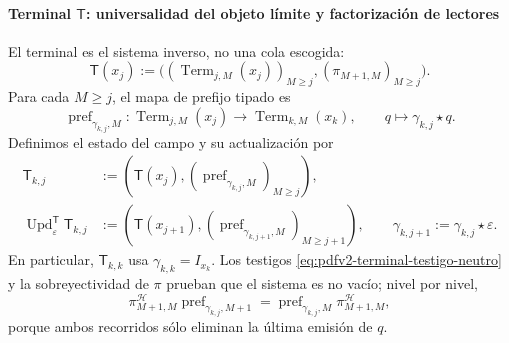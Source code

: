 \paragraph{Terminal \(\mathsf T\): universalidad del objeto límite y factorización de lectores}
El terminal es el sistema inverso, no una cola escogida:
\begin{equation}
\label{eq:pdfv2-terminal-sistema-inverso-campo}
 \mathsf T(x_j):=
 \bigl((\operatorname{Term}_{j,M}(x_j))_{M\geq j},
       (\pi_{M+1,M})_{M\geq j}\bigr).
\end{equation}
Para cada \(M\geq j\), el mapa de prefijo tipado es
\begin{equation}
\label{eq:pdfv2-terminal-update-t}
 \operatorname{pref}_{\gamma_{k,j},M}:
 \operatorname{Term}_{j,M}(x_j)\longrightarrow
 \operatorname{Term}_{k,M}(x_k),\qquad
 q\longmapsto\gamma_{k,j}\star q.
\end{equation}
Definimos el estado del campo y su actualización por
\begin{align}
 \mathsf T_{k,j}
 &:=
 \left(\mathsf T(x_j),
   (\operatorname{pref}_{\gamma_{k,j},M})_{M\geq j}\right),
 \label{eq:pdfv2-terminal-estado-t}\\
 \operatorname{Upd}^{\mathsf T}_{\varepsilon}\mathsf T_{k,j}
 &:=
 \left(\mathsf T(x_{j+1}),
   (\operatorname{pref}_{\gamma_{k,j+1},M})_{M\geq j+1}\right),
 \qquad \gamma_{k,j+1}:=\gamma_{k,j}\star\varepsilon.
 \label{eq:pdfv2-terminal-update-t-explicita}
\end{align}
En particular, \(\mathsf T_{k,k}\) usa
\(\gamma_{k,k}=I_{x_k}\). Los testigos
\eqref{eq:pdfv2-terminal-testigo-neutro} y la sobreyectividad de \(\pi\)
prueban que el sistema es no vacío; nivel por nivel,
\begin{equation}
\label{eq:pdfv2-terminal-prefijo-natural}
 \pi^{\mathscr H}_{M+1,M}
 \operatorname{pref}_{\gamma_{k,j},M+1}
 =\operatorname{pref}_{\gamma_{k,j},M}
  \pi^{\mathscr H}_{M+1,M},
\end{equation}
porque ambos recorridos sólo eliminan la última emisión de \(q\).

